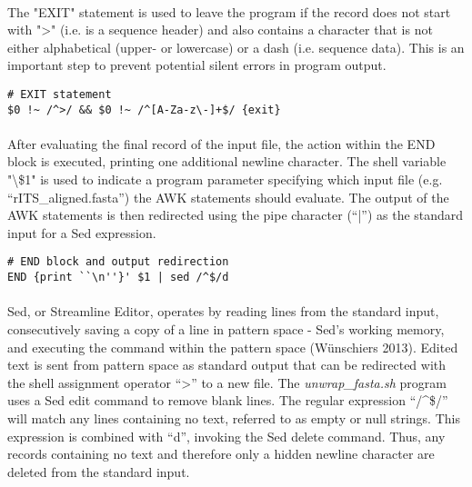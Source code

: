 \paragraph{} The "EXIT" statement is used to leave the program if the record does not start with ">" (i.e. is a sequence header) and also contains a character that is not either alphabetical (upper- or lowercase) or a dash (i.e. sequence data).  This is an important step to prevent potential silent errors in program output.  

\clearpage

\begin{lstlisting}[caption={\textit{unwrap\_fasta.sh} AWK EXIT statement}]
# EXIT statement
$0 !~ /^>/ && $0 !~ /^[A-Za-z\-]+$/ {exit}
\end{lstlisting}

\vspace*{30pt}

\paragraph{} After evaluating the final record of the input file, the action within the END block is executed, printing one additional newline character.  The shell variable "\textbackslash\$1" is used to indicate a program parameter specifying which input file (e.g. ``rITS\_aligned.fasta”) the AWK statements should evaluate.  The output of the AWK statements is then redirected using the pipe character (``|”) as the standard input for a Sed expression.

\vspace*{30pt}

\begin{lstlisting}[caption={AWK END Block and Sed Redirection}]
# END block and output redirection
END {print ``\n''}' $1 | sed /^$/d
\end{lstlisting}

\vspace*{30pt}

\paragraph{} Sed, or Streamline Editor, operates by reading lines from the standard input, consecutively saving a copy of a line in pattern space - Sed’s working memory, and executing the command within the pattern space (Wünschiers 2013).  Edited text is sent from pattern space as standard output that can be redirected with the shell assignment operator ``>” to a new file.  The \textit{unwrap\_fasta.sh} program uses a Sed edit command to remove blank lines.  The regular expression ``/\string^\$/” will match any lines containing no text, referred to as empty or null strings.  This expression is combined with ``d”, invoking the Sed delete command.  Thus, any records containing no text and therefore only a hidden newline character are deleted from the standard input.  


